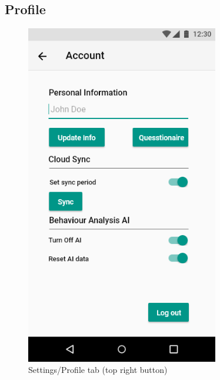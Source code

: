 \documentclass[a4paper,11pt]{article} %
\begin{document}
\subsection{Profile}
\begin{figure}[h!]
  \centering
  \includegraphics[width=0.75\textwidth]{img/ui-wireframe/Profile.png}
  \caption{Settings/Profile tab (top right button)}
\end{figure}
\end{document}
